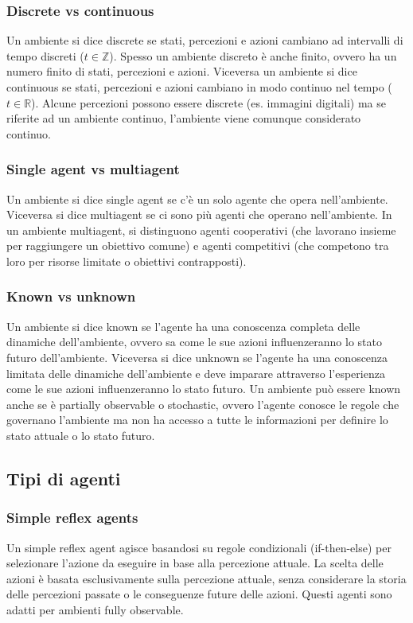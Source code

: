 \subsubsection*{Discrete vs continuous}
Un ambiente si dice discrete se stati, percezioni e azioni cambiano ad intervalli di tempo discreti (\(t \in \mathbb{Z}\)).
Spesso un ambiente discreto è anche finito, ovvero ha un numero finito di stati, percezioni e azioni. Viceversa un ambiente
si dice continuous se stati, percezioni e azioni cambiano in modo continuo nel tempo (\(t \in \mathbb{R}\)). Alcune percezioni
possono essere discrete (es. immagini digitali) ma se riferite ad un ambiente continuo, l'ambiente viene comunque considerato
continuo.

\subsubsection*{Single agent vs multiagent}
Un ambiente si dice single agent se c'è un solo agente che opera nell'ambiente. Viceversa si dice multiagent se ci sono
più agenti che operano nell'ambiente. In un ambiente multiagent, si distinguono agenti cooperativi (che lavorano insieme
per raggiungere un obiettivo comune) e agenti competitivi (che competono tra loro per risorse limitate o obiettivi
contrapposti).

\subsubsection*{Known vs unknown}
Un ambiente si dice known se l'agente ha una conoscenza completa delle dinamiche dell'ambiente, ovvero sa come le sue
azioni influenzeranno lo stato futuro dell'ambiente. Viceversa si dice unknown se l'agente ha una conoscenza limitata
delle dinamiche dell'ambiente e deve imparare attraverso l'esperienza come le sue azioni influenzeranno lo stato futuro.
Un ambiente può essere known anche se è partially observable o stochastic, ovvero l'agente conosce le regole che governano
l'ambiente ma non ha accesso a tutte le informazioni per definire lo stato attuale o lo stato futuro.

\subsection{Tipi di agenti}
\subsubsection*{Simple reflex agents}
Un simple reflex agent agisce basandosi su regole condizionali (if-then-else) per selezionare l'azione da eseguire in base
alla percezione attuale. La scelta delle azioni è basata esclusivamente sulla percezione attuale, senza considerare la storia
delle percezioni passate o le conseguenze future delle azioni. Questi agenti sono adatti per ambienti fully observable.

